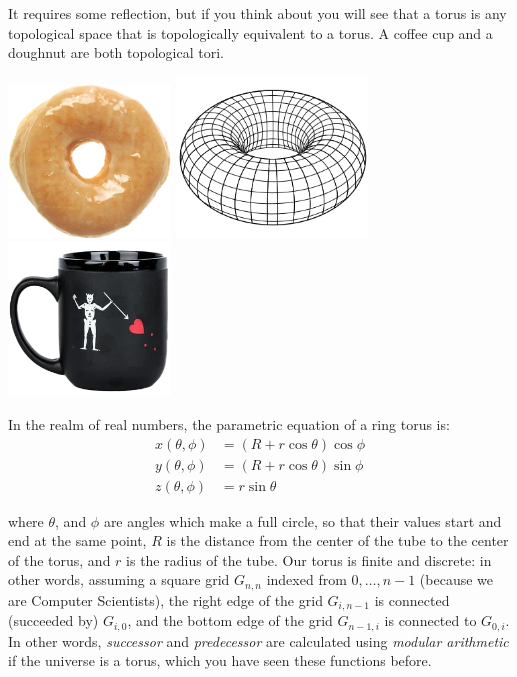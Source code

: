 \documentclass[11pt]{article}
\begin{document}
It requires some reflection, but if you think about you will see
that a torus is any topological space that is topologically equivalent
to a torus. A coffee cup and a doughnut are both topological tori.

\begin{center}
\includegraphics[width=1.7in]{images/donut.png}\hfil
\includegraphics[width=2in]{images/torus.png}\hfil
\includegraphics[width=1.7in]{images/cup.png}
\end{center}

In the realm of real numbers, the parametric equation of a ring torus is:
\begin{align*}
x(\theta, \phi) & = (R + r \cos \theta) \cos \phi \\
y(\theta, \phi) & = (R + r \cos \theta) \sin \phi \\
z(\theta, \phi) & = r \sin \theta
\end{align*}

\noindent where $\theta$, and $\phi$ are angles which make a full circle, so that their
values start and end at the same point, $R$ is the distance from the center of
the tube to the center of the torus, and $r$ is the radius of the tube.  Our
torus is finite and discrete: in other words, assuming a square grid $G_{n,n}$
indexed from $0, \ldots, n-1$ (because we are Computer Scientists), the right
edge of the grid $G_{i, n-1}$ is connected (succeeded by) $G_{i, 0}$, and the
bottom edge of the grid $G_{n-1, i}$ is connected to $G_{0, i}$.
In other words, \emph{successor} and \emph{predecessor} are calculated using \emph{modular
arithmetic} if the universe is a torus, which you have seen these functions before.
\end{document}
